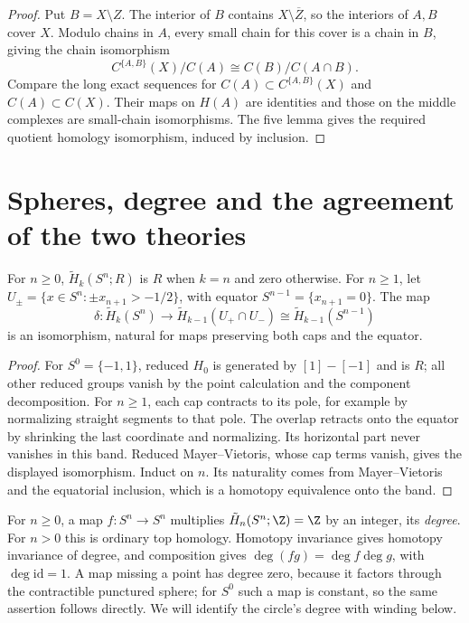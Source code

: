 \begin{proof}
Put $B=X\setminus Z$. The interior of $B$ contains $X\setminus\overline Z$, so the interiors of $A,B$ cover $X$. Modulo chains in $A$, every small chain for this cover is a chain in $B$, giving the chain isomorphism
\[
C^{\{A,B\}}(X)/C(A)\cong C(B)/C(A\cap B).
\]
Compare the long exact sequences for $C(A)\subset C^{\{A,B\}}(X)$ and $C(A)\subset C(X)$. Their maps on $H(A)$ are identities and those on the middle complexes are small-chain isomorphisms. The five lemma gives the required quotient homology isomorphism, induced by inclusion.
\end{proof}

\section{Spheres, degree and the agreement of the two theories}

\begin{theorem}\label{thm:spheres}
For $n\ge0$, $\tilde H_k(S^n;R)$ is $R$ when $k=n$ and zero otherwise. For $n\ge1$, let $U_\pm=\{x\in S^n:\pm x_{n+1}>-1/2\}$, with equator $S^{n-1}=\{x_{n+1}=0\}$. The map
\[
\delta:\tilde H_k(S^n)\longrightarrow\tilde H_{k-1}(U_+\cap U_-)
\cong\tilde H_{k-1}(S^{n-1})
\]
is an isomorphism, natural for maps preserving both caps and the equator.
\end{theorem}

\begin{proof}
For $S^0=\{-1,1\}$, reduced $H_0$ is generated by $[1]-[-1]$ and is $R$; all other reduced groups vanish by the point calculation and the component decomposition. For $n\ge1$, each cap contracts to its pole, for example by normalizing straight segments to that pole. The overlap retracts onto the equator by shrinking the last coordinate and normalizing. Its horizontal part never vanishes in this band. Reduced Mayer--Vietoris, whose cap terms vanish, gives the displayed isomorphism. Induct on $n$. Its naturality comes from Mayer--Vietoris and the equatorial inclusion, which is a homotopy equivalence onto the band.
\end{proof}

For $n\ge0$, a map $f:S^n\to S^n$ multiplies $\tilde H_n(S^n;\Z)=\Z$ by an integer, its \emph{degree}. For $n>0$ this is ordinary top homology. Homotopy invariance gives homotopy invariance of degree, and composition gives $\deg(fg)=\deg f\deg g$, with $\deg\mathrm{id}=1$. A map missing a point has degree zero, because it factors through the contractible punctured sphere; for $S^0$ such a map is constant, so the same assertion follows directly. We will identify the circle's degree with winding below.

